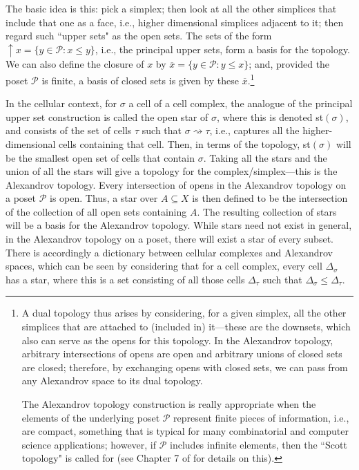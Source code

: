 \documentclass[a4paper]{book}
\theoremstyle{definition}
\theoremstyle{definition}
\theoremstyle{definition}
\theoremstyle{theorem}
\theoremstyle{definition}
\begin{document}
The basic idea is this: pick a simplex; then look at all the other simplices that include that one as a face, i.e., higher dimensional simplices adjacent to it; then regard such ``upper sets" as the open sets. The sets of the form $\uparrow x = \{y \in \mathcal{P}: x \leq y \}$, i.e., the principal upper sets, form a basis for the topology. We can also define the closure of $x$ by $\overline{x} = \{y \in \mathcal{P}: y \leq x \}$; and, provided the poset $\mathcal{P}$ is finite, a basis of closed sets is given by these $\overline{x}$.\footnote{A dual topology thus arises by considering, for a given simplex, all the other simplices that are attached to (included in) it---these are the downsets, which also can serve as the opens for this topology. In the Alexandrov topology, arbitrary intersections of opens are open and arbitrary unions of closed sets are closed; therefore, by exchanging opens with closed sets, we can pass from any Alexandrov space to its dual topology. \par The Alexandrov topology construction is really appropriate when the elements of the underlying poset $\mathcal{P}$ represent finite pieces of information, i.e., are compact, something that is typical for many combinatorial and computer science applications; however, if $\mathcal{P}$ includes infinite elements, then the ``Scott topology" is called for (see Chapter 7 of \cite{vickers_topology_1996} for details on this).} \par 
In the cellular context, for $\sigma$ a cell of a cell complex, the analogue of the principal upper set construction is called the open star of $\sigma$, where this is denoted st$(\sigma)$, and consists of the set of cells $\tau$ such that $\sigma \rightsquigarrow \tau$, i.e., captures all the higher-dimensional cells containing that cell. Then, in terms of the topology, st$(\sigma)$ will be the smallest open set of cells that contain $\sigma$. Taking all the stars and the union of all the stars will give a topology for the complex/simplex---this is the Alexandrov topology. Every intersection of opens in the Alexandrov topology on a poset $\mathcal{P}$ is open. Thus, a star over $A \subseteq  X$ is then defined to be the intersection of the collection of all open sets containing $A$. The resulting collection of stars will be a basis for the Alexandrov topology.  While stars need not exist in general, in the Alexandrov topology on a poset, there will exist a star of every subset. There is accordingly a dictionary between cellular complexes and Alexandrov spaces, which can be seen by considering that for a cell complex, every cell $\Delta_{\sigma}$ has a star, where this is a set consisting of all those cells $\Delta_{\tau}$ such that $\Delta_{\sigma} \leq \Delta_{\tau}$. \par 
\end{document}

